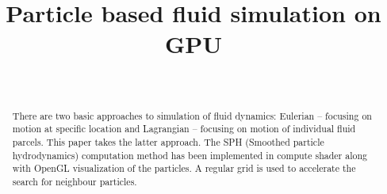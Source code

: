 \documentclass[a4paper,report]{IEEEtran}
\begin{document}
\title{Particle based fluid simulation on GPU}


\author{\\
}
 




\maketitle


\begin{abstract}
	There are two basic approaches to simulation of fluid dynamics: Eulerian -- focusing on motion at specific location and Lagrangian -- focusing on motion of individual fluid parcels. This paper takes the latter approach. The SPH (Smoothed particle hydrodynamics) computation method has been implemented in compute shader along with OpenGL visualization of the particles. A regular grid is used to accelerate the search for neighbour particles.

\end{abstract}
\end{document}
